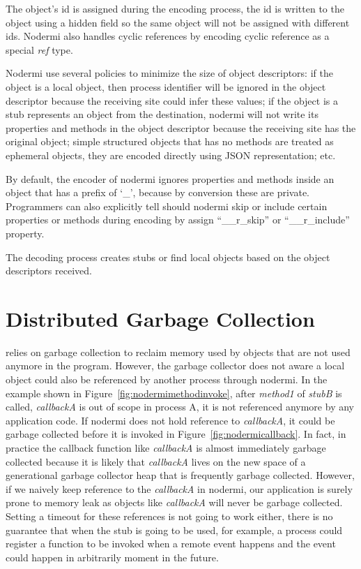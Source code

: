 The object's id is assigned during the encoding process, the id is written to the object
using a hidden field so the same object will not be assigned with different ids.
Nodermi also handles cyclic references by encoding cyclic reference as a special \emph{ref}
type.

Nodermi use several policies to minimize the size of object descriptors:
if the object is a local object, then process identifier will be ignored 
in the object descriptor because the receiving site could infer these values;
if the object is a stub represents an object from the destination,
nodermi will not write its properties and methods in the object descriptor 
because the receiving site has the original object;
simple structured objects that has no methods are treated as
ephemeral objects, they are encoded directly using JSON representation; etc.

By default, the encoder of nodermi ignores properties and methods inside 
an object that has a prefix of `\_', 
because by conversion these are private.
Programmers can also explicitly tell should nodermi skip or include 
certain properties or methods during encoding by assign 
``\_\_r\_skip'' or ``\_\_r\_include'' property.

The decoding process creates stubs or find local objects based on
the object descriptors received.

\section{Distributed Garbage Collection}
\js{} relies on garbage collection to reclaim memory used by 
objects that are not used anymore in the program.
However, the garbage collector does not aware a local object
could also be referenced by another process through nodermi.
In the example shown in Figure~\ref{fig:nodermimethodinvoke},
after \emph{method1} of \emph{stubB} is called, 
\emph{callbackA} is out of scope in process A, 
it is not referenced anymore by any application code.
If nodermi does not hold reference to \emph{callbackA},
it could be garbage collected before it is invoked in Figure~\ref{fig:nodermicallback}.
In fact, in practice the callback function like \emph{callbackA} is almost
immediately garbage collected because it is likely that \emph{callbackA}
lives on the new space of a generational garbage collector heap that is frequently
garbage collected.
However, if we naively keep reference to the \emph{callbackA} in nodermi,
our application is surely prone to memory leak as objects like \emph{callbackA}
will never be garbage collected.
Setting a timeout for these references is not going to work either,
there is no guarantee that when the stub is going to be used,
for example, a process could register a function to be invoked when
a remote event happens and the event could happen in arbitrarily moment in the future.

